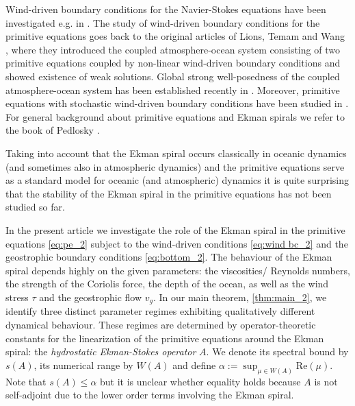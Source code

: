 \documentclass[preprint]{elsarticle}
\numberwithin{equation}{section}
\renewcommand{\Re}{\mathrm{Re}}
\newcommand{\btb}{\color{black}}
\newcommand{\etb}{\color{black}}
\begin{document}
\smallskip 

Wind-driven boundary conditions for the Navier-Stokes equations have been investigated e.g. in
\cite{DG:00_2,BS:01_2,BGMR:03_2,DS:09_2}. 
The study of wind-driven boundary conditions for the primitive equations goes back to the original articles of Lions, Temam and Wang \cite{LTW:93_2,LTW:95_2}, where they introduced the coupled atmosphere-ocean system consisting of two primitive equations coupled by non-linear wind-driven boundary conditions and showed existence of weak solutions. Global strong well-posedness of the coupled atmosphere-ocean system has been established recently in \cite{BBHZ:25_2}. 
Moreover, primitive equations with stochastic wind-driven boundary conditions have been studied in \cite{BHHS:24_2}. 
For general background about primitive equations and Ekman spirals we refer to the book of Pedlosky \cite{Ped:87_2}.
%

\medskip

Taking into account that the Ekman spiral occurs classically in oceanic dynamics (and sometimes also in atmospheric dynamics) and the primitive equations serve as a standard model for oceanic (and atmospheric)
dynamics it is quite surprising that the stability of the Ekman spiral in the primitive equations has not been studied so far. 

\medskip 

In the present article we investigate the role of the Ekman spiral in the primitive equations \eqref{eq:pe_2} subject to the wind-driven conditions \eqref{eq:wind bc_2} and the geostrophic boundary conditions \eqref{eq:bottom_2}.
The behaviour of the Ekman spiral depends highly on the given parameters: the viscosities/ Reynolds numbers, the strength of the Coriolis force, the depth of the ocean, as well as the wind stress $\tau$ and the geostrophic flow $v_g$. 
In our main theorem, \autoref{thm:main_2}, we identify three distinct parameter regimes exhibiting qualitatively different dynamical behaviour. These regimes are determined by operator-theoretic constants for the linearization of the primitive equations around the Ekman spiral: the \emph{hydrostatic Ekman-Stokes operator} $A$. We denote its spectral bound by $s(A)$, its numerical range by $W(A)$ and define $\alpha := \sup_{\mu \in W(A)} \Re (\mu)$. Note that $s(A) \leq \alpha$ but it is unclear whether equality holds because $A$ is not self-adjoint due to the lower order terms involving the Ekman spiral. 
\end{document}
